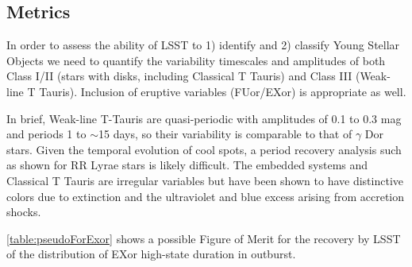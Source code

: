 



\subsection{Metrics}
\label{sec:\secname:metrics}

In order to assess the ability of LSST to 1) identify and 2) classify
Young Stellar Objects we need to quantify the variability timescales
and amplitudes of both Class I/II (stars with disks, including
Classical T Tauris) and Class III (Weak-line T Tauris).  Inclusion of
eruptive variables (FUor/EXor) is appropriate as well.

In brief, Weak-line T-Tauris are quasi-periodic with amplitudes of 0.1
to 0.3 mag and periods 1 to $\sim$15 days, so their variability is
comparable to that of $\gamma$ Dor stars. Given the temporal evolution
of cool spots, a period recovery analysis such as shown for RR Lyrae
stars is likely difficult.  The embedded systems and Classical T
Tauris are irregular variables but have been shown to have distinctive
colors due to extinction and the ultraviolet and blue excess arising
from accretion shocks.

\autoref{table:pseudoForExor} shows a possible Figure of Merit for the
recovery by LSST of the distribution of EXor high-state duration in
outburst.


